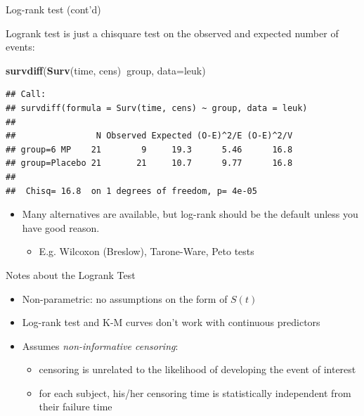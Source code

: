 \documentclass[
  ignorenonframetext,
]{beamer}
\newenvironment{Shaded}{\begin{snugshade}}{\end{snugshade}}
\newcommand{\DataTypeTok}[1]{\textcolor[rgb]{0.13,0.29,0.53}{#1}}
\newcommand{\KeywordTok}[1]{\textcolor[rgb]{0.13,0.29,0.53}{\textbf{#1}}}
\newcommand{\NormalTok}[1]{#1}
\newcommand{\OperatorTok}[1]{\textcolor[rgb]{0.81,0.36,0.00}{\textbf{#1}}}
\providecommand{\tightlist}{%
  \setlength{\itemsep}{0pt}\setlength{\parskip}{0pt}}
\begin{document}
\begin{frame}[fragile]{Log-rank test (cont'd)}
\protect\hypertarget{log-rank-test-contd}{}

Logrank test is just a chisquare test on the observed and expected
number of events:

\footnotesize

\begin{Shaded}
\begin{Highlighting}[]
\KeywordTok{survdiff}\NormalTok{(}\KeywordTok{Surv}\NormalTok{(time, cens)}\OperatorTok{~}\NormalTok{group, }\DataTypeTok{data=}\NormalTok{leuk)}
\end{Highlighting}
\end{Shaded}

\begin{verbatim}
## Call:
## survdiff(formula = Surv(time, cens) ~ group, data = leuk)
## 
##                N Observed Expected (O-E)^2/E (O-E)^2/V
## group=6 MP    21        9     19.3      5.46      16.8
## group=Placebo 21       21     10.7      9.77      16.8
## 
##  Chisq= 16.8  on 1 degrees of freedom, p= 4e-05
\end{verbatim}

\begin{itemize}
\tightlist
\item
  Many alternatives are available, but log-rank should be the default
  unless you have good reason.

  \begin{itemize}
  \tightlist
  \item
    E.g. Wilcoxon (Breslow), Tarone-Ware, Peto tests
  \end{itemize}
\end{itemize}

\end{frame}

\begin{frame}{Notes about the Logrank Test}
\protect\hypertarget{notes-about-the-logrank-test}{}

\begin{itemize}
\tightlist
\item
  Non-parametric: no assumptions on the form of \(S(t)\)
\item
  Log-rank test and K-M curves don't work with continuous predictors
\item
  Assumes \emph{non-informative censoring}:

  \begin{itemize}
  \tightlist
  \item
    censoring is unrelated to the likelihood of developing the event of
    interest
  \item
    for each subject, his/her censoring time is statistically
    independent from their failure time
  \end{itemize}
\end{itemize}

\end{frame}
\end{document}
